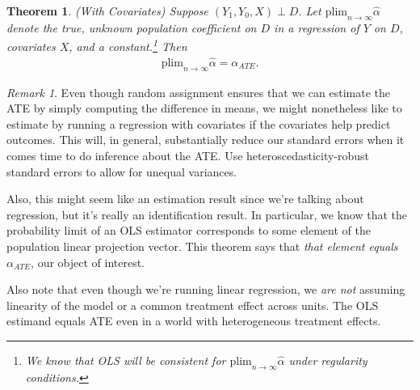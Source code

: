 \documentclass[12pt]{article}
\theoremstyle{plain}
\newtheorem{thm}{Theorem}[section]
\theoremstyle{definition}
\theoremstyle{remark}
\newtheorem*{rmk}{Remark}
\newcommand{\plim}{\text{plim}_{n\rightarrow\infty}}
\begin{document}
\begin{thm}
\emph{(With Covariates)}
Suppose $(Y_1,Y_0,X)\perp D$.
Let $\plim \hat{\alpha}$ denote the true, unknown population coefficient
on $D$ in a regression of $Y$ on $D$, covariates $X$, and a
constant.\footnote{%
  We know that OLS will be consistent for $\plim \hat{\alpha}$ under
  regularity conditions.
}
Then
\begin{align*}
  \plim
  \hat{\alpha}
  =
  \alpha_{ATE}
  .
\end{align*}
\end{thm}
\begin{rmk}
Even though random assignment ensures that we can estimate the ATE by
simply computing the difference in means, we might nonetheless like to
estimate by running a regression with covariates if the covariates help
predict outcomes.
This will, in general, substantially reduce our standard errors when it
comes time to do inference about the ATE.
Use heteroscedasticity-robust standard errors to allow for unequal
variances.

Also, this might seem like an estimation result since we're talking
about regression, but it's really an identification result.  In
particular, we know that the probability limit of an OLS estimator
corresponds to some element of the population linear projection vector.
This theorem says that \emph{that element equals $\alpha_{ATE}$}, our
object of interest.

Also note that even though we're running linear regression, we
\emph{are not} assuming linearity of the model or a common treatment
effect across units.
The OLS estimand equals ATE even in a world with heterogeneous treatment
effects.
\end{rmk}
\end{document}
